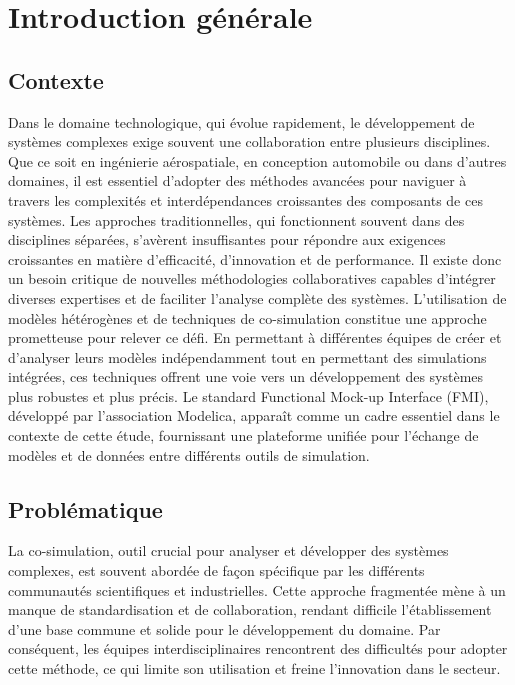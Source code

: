 \chapter*{Introduction générale}
\label{chap:introduction}

\section*{Contexte}

Dans le domaine technologique, qui évolue rapidement, le développement de systèmes complexes exige souvent une collaboration entre plusieurs disciplines. Que ce soit en ingénierie aérospatiale, en conception automobile ou dans d'autres domaines, il est essentiel d'adopter des méthodes avancées pour naviguer à travers les complexités et interdépendances croissantes des composants de ces systèmes. Les approches traditionnelles, qui fonctionnent souvent dans des disciplines séparées, s'avèrent insuffisantes pour répondre aux exigences croissantes en matière d'efficacité, d'innovation et de performance. Il existe donc un besoin critique de nouvelles méthodologies collaboratives capables d'intégrer diverses expertises et de faciliter l'analyse complète des systèmes. L'utilisation de modèles hétérogènes et de techniques de co-simulation constitue une approche prometteuse pour relever ce défi. En permettant à différentes équipes de créer et d'analyser leurs modèles indépendamment tout en permettant des simulations intégrées, ces techniques offrent une voie vers un développement des systèmes plus robustes et plus précis. Le standard Functional Mock-up Interface (FMI), développé par l'association Modelica, apparaît comme un cadre essentiel dans le contexte de cette étude, fournissant une plateforme unifiée pour l'échange de modèles et de données entre différents outils de simulation.

\section*{Problématique}

La co-simulation, outil crucial pour analyser et développer des systèmes complexes, est souvent abordée de façon spécifique par les différents communautés scientifiques et industrielles. Cette approche fragmentée mène à un manque de standardisation et de collaboration, rendant difficile l'établissement d'une base commune et solide pour le développement du domaine. Par conséquent, les équipes interdisciplinaires rencontrent des difficultés pour adopter cette méthode, ce qui limite son utilisation et freine l'innovation dans le secteur.

